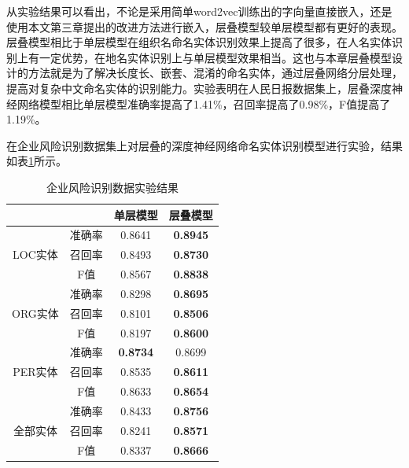 \documentclass[winfonts,master,oneside,nobackinfo]{njuthesis}
\begin{document}
从实验结果可以看出，不论是采用简单word2vec训练出的字向量直接嵌入，还是使用本文第三章提出的改进方法进行嵌入，层叠模型较单层模型都有更好的表现。层叠模型相比于单层模型在组织名命名实体识别效果上提高了很多，在人名实体识别上有一定优势，在地名实体识别上与单层模型效果相当。这也与本章层叠模型设计的方法就是为了解决长度长、嵌套、混淆的命名实体，通过层叠网络分层处理，提高对复杂中文命名实体的识别能力。实验表明在人民日报数据集上，层叠深度神经网络模型相比单层模型准确率提高了1.41\%，召回率提高了0.98\%，F值提高了1.19\%。

在企业风险识别数据集上对层叠的深度神经网络命名实体识别模型进行实验，结果如表\ref{risk}所示。
\begin{table}[H]
\centering
\begin{tabular}{|c|c|c|c|}
\hline
\multicolumn{2}{|c|}{}                  & 单层模型           & 层叠模型          \\ \hline
\multirow{3}{*}{LOC实体}       & 准确率      & 0.8641         & \textbf{0.8945}        \\ \cline{2-4} 
                             & 召回率      & 0.8493         & \textbf{0.8730}        \\ \cline{2-4} 
                             & F值       & 0.8567         & \textbf{0.8838}        \\ \hline
\multirow{3}{*}{ORG实体}       & 准确率      & 0.8298         & \textbf{0.8695}        \\ \cline{2-4} 
                             & 召回率      & 0.8101         & \textbf{0.8506}        \\ \cline{2-4} 
                             & F值       & 0.8197         & \textbf{0.8600}        \\ \hline
\multirow{3}{*}{PER实体}       & 准确率      & \textbf{0.8734}         & 0.8699        \\ \cline{2-4} 
                             & 召回率      & 0.8535         & \textbf{0.8611}        \\ \cline{2-4} 
                             & F值       & 0.8633         & \textbf{0.8654}        \\ \hline
\multirow{3}{*}{全部实体}        & 准确率      & 0.8433         & \textbf{0.8756}        \\ \cline{2-4} 
                             & 召回率      & 0.8241         & \textbf{0.8571}        \\ \cline{2-4} 
                             & F值       & 0.8337         &\textbf{0.8666}        \\ \hline
\end{tabular}
\caption{企业风险识别数据实验结果}
\label{risk}
\end{table}
\end{document}
